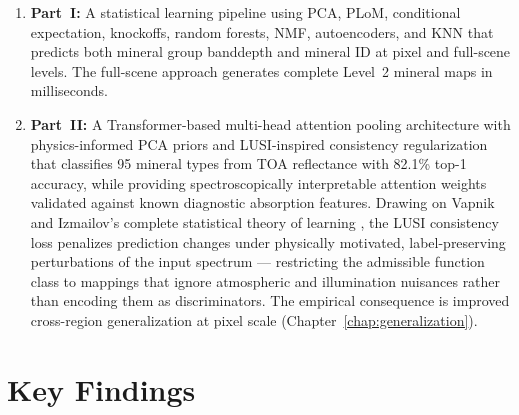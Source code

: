 \documentclass[11pt]{report}
\begin{document}
\begin{enumerate}
  \item \textbf{Part~I:} A statistical learning pipeline using PCA, PLoM, conditional expectation, knockoffs, random forests, NMF, autoencoders, and KNN that predicts both mineral group banddepth and mineral ID at pixel and full-scene levels. The full-scene approach generates complete Level~2 mineral maps in milliseconds.

  \item \textbf{Part~II:} A Transformer-based multi-head attention pooling architecture with physics-informed PCA priors and LUSI-inspired consistency regularization that classifies 95 mineral types from TOA reflectance with 82.1\% top-1 accuracy, while providing spectroscopically interpretable attention weights validated against known diagnostic absorption features. Drawing on Vapnik and Izmailov's complete statistical theory of learning \cite{vapnik2020}, the LUSI consistency loss penalizes prediction changes under physically motivated, label-preserving perturbations of the input spectrum --- restricting the admissible function class to mappings that ignore atmospheric and illumination nuisances rather than encoding them as discriminators. The empirical consequence is improved cross-region generalization at pixel scale (Chapter~\ref{chap:generalization}).
\end{enumerate}

\section{Key Findings}
\end{document}
